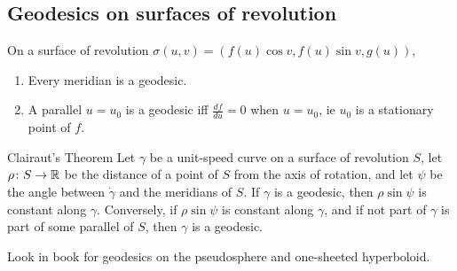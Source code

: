 \subsection{Geodesics on surfaces of revolution}
\begin{prop}
    On a surface of revolution $\sigma(u,v)=(f(u) \cos v, f(u) \sin v, g(u))$, 
    \begin{enumerate}[label=(\roman*)]
    \setlength\itemsep{-.2em}
        \item Every meridian is a geodesic.
        \item A parallel $u=u_0$ is a geodesic iff $\frac{df}{du}=0$ when $u=u_0$, ie $u_0$ is a stationary point of $f.$
    \end{enumerate}
\end{prop}
\begin{namedthm}{Clairaut's Theorem} 
    Let $\gamma $ be a unit-speed curve on a surface of revolution $S$, let $\rho \colon S \to \mathbb{R}$ be the distance of a point of $S$ from the axis of rotation, and let $\psi$ be the angle between $\dot \gamma $ and the meridians of $S$. If $\gamma $ is a geodesic, then $\rho \sin \psi $ is constant along $\gamma $. Conversely, if $\rho \sin \psi $ is constant along $\gamma $, and if not part of $\gamma $ is part of some parallel of $S$, then $\gamma $ is a geodesic.
\end{namedthm}
\begin{example}
    Look in book for geodesics on the pseudosphere and one-sheeted hyperboloid.
\end{example}

